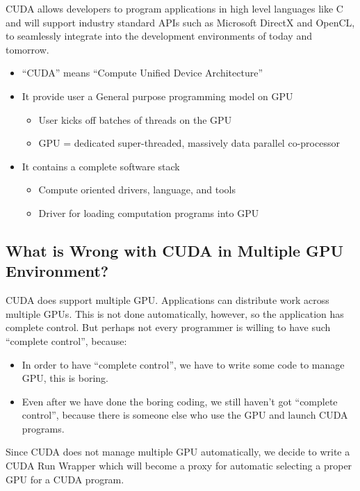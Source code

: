 \documentclass[a4paper,11pt]{article}
\begin{document}
CUDA allows developers to program applications in high level languages like C and will support industry standard APIs such as Microsoft DirectX and OpenCL, to seamlessly integrate into the development environments of today and tomorrow.
\begin{itemize}
  \item ``CUDA'' means ``Compute Unified Device Architecture''
  \item It provide user a General purpose programming model on GPU
    \begin{itemize}
      \item User kicks off batches of threads on the GPU
      \item GPU = dedicated super-threaded, massively data parallel co-processor
    \end{itemize}
  \item It contains a complete software stack
    \begin{itemize}
      \item Compute oriented drivers, language, and tools
      \item Driver for loading computation programs into GPU
     \end{itemize}
\end{itemize}
\subsection{What is Wrong with CUDA in Multiple GPU Environment?}
CUDA does support multiple GPU. Applications can distribute work across multiple GPUs. This is not done automatically, however, so the application has complete control. But perhaps not every programmer is willing to have such ``complete control'', because:
\begin{itemize}
  \item In order to have ``complete control'', we have to write some code to manage GPU, this is boring. 
  \item Even after we have done the boring coding, we still haven't got ``complete control'', because there is someone else who use the GPU and launch CUDA programs.
\end{itemize}
Since CUDA does not manage multiple GPU automatically, we decide to write a CUDA Run Wrapper which will become a proxy for automatic selecting a proper GPU for a CUDA program.
\end{document}
